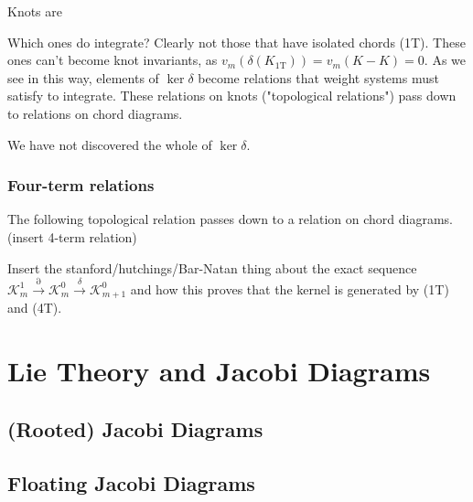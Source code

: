 \documentclass[12pt]{report}
\theoremstyle{regular}
\numberwithin{clause}{chapter}
\newcommand{\scaffold}[1]{
\begin{mdframed}[style=scaffold]
        {\color{teal}#1}
\end{mdframed}
}
\begin{document}
        Knots are

        \scaffold{Which ones do integrate? Clearly not those that have isolated chords (1T). These ones can't become knot invariants, as \(v_{m}(\delta(K_{\text{1T}})) = v_{m}(K - K) = 0\). As we see in this way, elements of \(\ker \delta\) become relations that weight systems must satisfy to integrate. These relations on knots ("topological relations") pass down to relations on chord diagrams.}

        \scaffold{We have not discovered the whole of \(\ker \delta\).}

        \subsection{Four-term relations}

        \scaffold{The following topological relation passes down to a relation on chord diagrams. (insert 4-term relation)}

        \scaffold{Insert the stanford/hutchings/Bar-Natan thing about the exact sequence \(\mathcal{K}^{1}_{m} \xrightarrow{\partial} \mathcal{K}^{0}_{m} \xrightarrow{\delta} \mathcal{K}^{0}_{m + 1}\) and how this proves that the kernel is generated by (1T) and (4T).}


        \chapter{Lie Theory and Jacobi Diagrams}
        \label{ch:lie-theory-and-jacobi-diagrams}

        \section{(Rooted) Jacobi Diagrams}

        \section{Floating Jacobi Diagrams}
\end{document}
